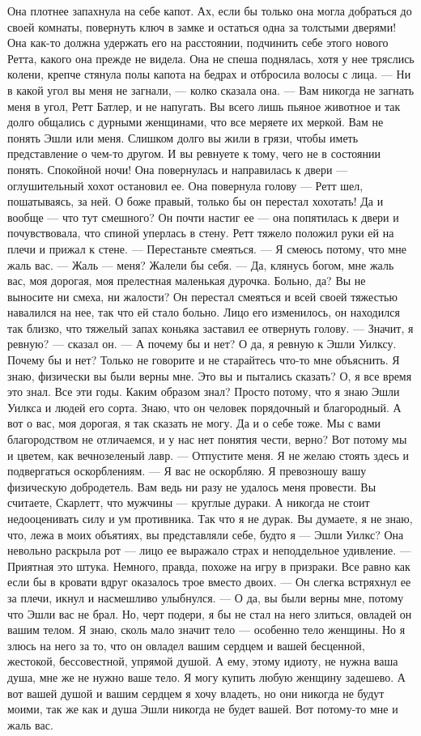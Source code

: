 Она плотнее запахнула на себе капот. Ах, если бы только она могла добраться до своей комнаты, повернуть ключ в замке и остаться одна за толстыми дверями! Она как-то должна удержать его на расстоянии, подчинить себе этого нового Ретта, какого она прежде не видела. Она не спеша поднялась, хотя у нее тряслись колени, крепче стянула полы капота на бедрах и отбросила волосы с лица.
— Ни в какой угол вы меня не загнали, — колко сказала она. — Вам никогда не загнать меня в угол, Ретт Батлер, и не напугать. Вы всего лишь пьяное животное и так долго общались с дурными женщинами, что все меряете их меркой. Вам не понять Эшли или меня. Слишком долго вы жили в грязи, чтобы иметь представление о чем-то другом. И вы ревнуете к тому, чего не в состоянии понять. Спокойной ночи!
Она повернулась и направилась к двери — оглушительный хохот остановил ее. Она повернула голову — Ретт шел, пошатываясь, за ней. О боже правый, только бы он перестал хохотать! Да и вообще — что тут смешного? Он почти настиг ее — она попятилась к двери и почувствовала, что спиной уперлась в стену. Ретт тяжело положил руки ей на плечи и прижал к стене.
— Перестаньте смеяться.
— Я смеюсь потому, что мне жаль вас.
— Жаль — меня? Жалели бы себя.
— Да, клянусь богом, мне жаль вас, моя дорогая, моя прелестная маленькая дурочка. Больно, да? Вы не выносите ни смеха, ни жалости?
Он перестал смеяться и всей своей тяжестью навалился на нее, так что ей стало больно. Лицо его изменилось, он находился так близко, что тяжелый запах коньяка заставил ее отвернуть голову.
— Значит, я ревную? — сказал он. — А почему бы и нет? О да, я ревную к Эшли Уилксу. Почему бы и нет? Только не говорите и не старайтесь что-то мне объяснить. Я знаю, физически вы были верны мне. Это вы и пытались сказать? О, я все время это знал. Все эти годы. Каким образом знал? Просто потому, что я знаю Эшли Уилкса и людей его сорта. Знаю, что он человек порядочный и благородный. А вот о вас, моя дорогая, я так сказать не могу. Да и о себе тоже. Мы с вами благородством не отличаемся, и у нас нет понятия чести, верно? Вот потому мы и цветем, как вечнозеленый лавр.
— Отпустите меня. Я не желаю стоять здесь и подвергаться оскорблениям.
— Я вас не оскорбляю. Я превозношу вашу физическую добродетель. Вам ведь ни разу не удалось меня провести. Вы считаете, Скарлетт, что мужчины — круглые дураки. А никогда не стоит недооценивать силу и ум противника. Так что я не дурак. Вы думаете, я не знаю, что, лежа в моих объятиях, вы представляли себе, будто я — Эшли Уилкс?
Она невольно раскрыла рот — лицо ее выражало страх и неподдельное удивление.
— Приятная это штука. Немного, правда, похоже на игру в призраки. Все равно как если бы в кровати вдруг оказалось трое вместо двоих. — Он слегка встряхнул ее за плечи, икнул и насмешливо улыбнулся. — О да, вы были верны мне, потому что Эшли вас не брал. Но, черт подери, я бы не стал на него злиться, овладей он вашим телом. Я знаю, сколь мало значит тело — особенно тело женщины. Но я злюсь на него за то, что он овладел вашим сердцем и вашей бесценной, жестокой, бессовестной, упрямой душой. А ему, этому идиоту, не нужна ваша душа, мне же не нужно ваше тело. Я могу купить любую женщину задешево. А вот вашей душой и вашим сердцем я хочу владеть, но они никогда не будут моими, так же как и душа Эшли никогда не будет вашей. Вот потому-то мне и жаль вас.
